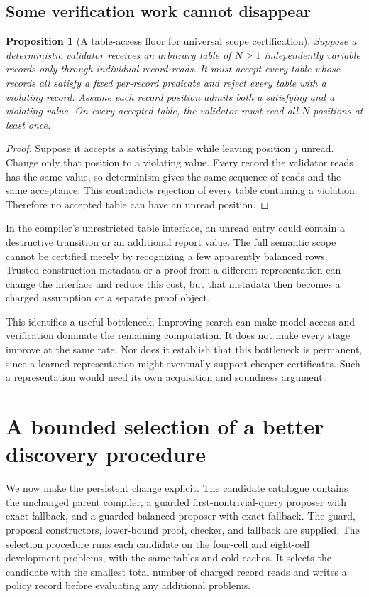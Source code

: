 \documentclass[11pt,letterpaper]{article}
\theoremstyle{plain}
\newtheorem{proposition}[theorem]{Proposition}
\theoremstyle{definition}
\begin{document}
\subsection{Some verification work cannot disappear}
\begin{proposition}[A table-access floor for universal scope certification]\label{prop:table-floor}
Suppose a deterministic validator receives an arbitrary table of $N\geq1$ independently variable records only through individual record reads. It must accept every table whose records all satisfy a fixed per-record predicate and reject every table with a violating record. Assume each record position admits both a satisfying and a violating value. On every accepted table, the validator must read all $N$ positions at least once.
\end{proposition}
\begin{proof}
Suppose it accepts a satisfying table while leaving position $j$ unread. Change only that position to a violating value. Every record the validator reads has the same value, so determinism gives the same sequence of reads and the same acceptance. This contradicts rejection of every table containing a violation. Therefore no accepted table can have an unread position.
\end{proof}

In the compiler's unrestricted table interface, an unread entry could contain a destructive transition or an additional report value. The full semantic scope cannot be certified merely by recognizing a few apparently balanced rows. Trusted construction metadata or a proof from a different representation can change the interface and reduce this cost, but that metadata then becomes a charged assumption or a separate proof object.

This identifies a useful bottleneck. Improving search can make model access and verification dominate the remaining computation. It does not make every stage improve at the same rate. Nor does it establish that this bottleneck is permanent, since a learned representation might eventually support cheaper certificates. Such a representation would need its own acquisition and soundness argument.

\section{A bounded selection of a better discovery procedure}\label{sec:method-selection}
We now make the persistent change explicit. The candidate catalogue contains the unchanged parent compiler, a guarded first-nontrivial-query proposer with exact fallback, and a guarded balanced proposer with exact fallback. The guard, proposal constructors, lower-bound proof, checker, and fallback are supplied. The selection procedure runs each candidate on the four-cell and eight-cell development problems, with the same tables and cold caches. It selects the candidate with the smallest total number of charged record reads and writes a policy record before evaluating any additional problems.
\end{document}
